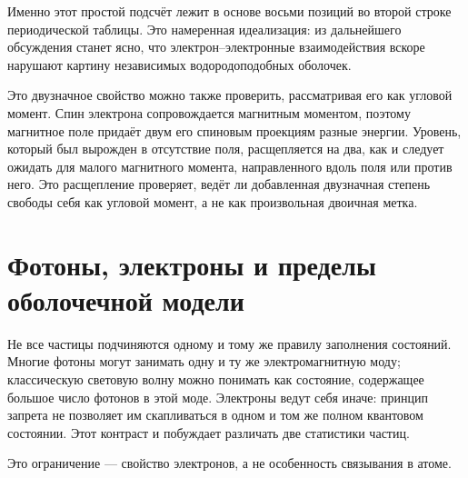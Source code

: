 Именно этот простой подсчёт лежит в основе восьми позиций во второй строке периодической таблицы. Это намеренная идеализация: из дальнейшего обсуждения станет ясно, что электрон--электронные взаимодействия вскоре нарушают картину независимых водородоподобных оболочек.

Это двузначное свойство можно также проверить, рассматривая его как угловой момент. Спин электрона сопровождается магнитным моментом, поэтому магнитное поле придаёт двум его спиновым проекциям разные энергии. Уровень, который был вырожден в отсутствие поля, расщепляется на два, как и следует ожидать для малого магнитного момента, направленного вдоль поля или против него. Это расщепление проверяет, ведёт ли добавленная двузначная степень свободы себя как угловой момент, а не как произвольная двоичная метка.

\section{Фотоны, электроны и пределы оболочечной модели}

Не все частицы подчиняются одному и тому же правилу заполнения состояний. Многие фотоны могут занимать одну и ту же электромагнитную моду; классическую световую волну можно понимать как состояние, содержащее большое число фотонов в этой моде. Электроны ведут себя иначе: принцип запрета не позволяет им скапливаться в одном и том же полном квантовом состоянии. Этот контраст и побуждает различать две статистики частиц.

\begin{classroomqa}
\end{classroomqa}

Это ограничение — свойство электронов, а не особенность связывания в атоме.

\begin{classroomqa}
\end{classroomqa}

